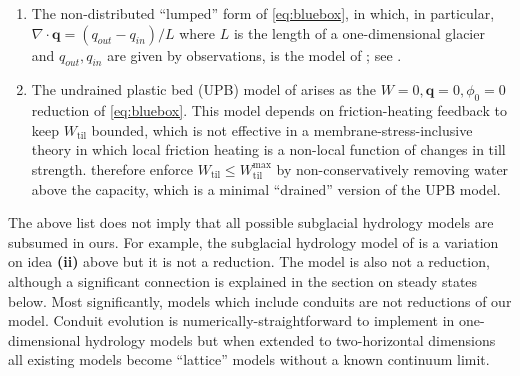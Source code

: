 \documentclass[gmd]{copernicus}   %
\newcommand{\text}{\textrm}
\newcommand\bq{\mathbf{q}}
\newcommand{\Div}{\nabla\cdot}
\newcommand{\Wtil}{W_{\text{til}}}
\newcommand{\Wtilmax}{W_{\text{til}}^{\text{max}}}
\begin{document}
\begin{enumerate}
\item The non-distributed ``lumped'' form of \eqref{eq:bluebox}, in which, in particular, $\Div \bq = (q_{out} - q_{in})/L$ where $L$ is the length of a one-dimensional glacier and $q_{out},q_{in}$ are given by observations, is the model of \cite{Bartholomausetal2011}; see \cite{Bueler2014correspondence}.

\item The undrained plastic bed (UPB) model of \cite{Tulaczyketal2000b} arises as the $W=0,\bq=0,\phi_0=0$ reduction of \eqref{eq:bluebox}.  This model depends on friction-heating feedback to keep $\Wtil$ bounded, which is not effective in a membrane-stress-inclusive theory in which local friction heating is a non-local function of changes in till strength.  \cite{BBssasliding} therefore enforce $\Wtil \le \Wtilmax$ by non-conservatively removing water above the capacity, which is a minimal ``drained'' version of the UPB model.
\end{enumerate}

The above list does not imply that all possible subglacial hydrology models are subsumed in ours.  For example, the subglacial hydrology model of \cite{JohnsonFastook} is a variation on idea \textbf{(ii)} above but it is not a reduction.  The \cite{FlowersClarke2002_theory} model is also not a reduction, although a significant connection is explained in the section on steady states below.  Most significantly, models which include conduits \citep[among others]{Schoofmeltsupply,PimentelFlowers2011,Hewittetal2012} are not reductions of our model.  Conduit evolution is numerically-straightforward to implement in one-dimensional hydrology models \citep{PimentelFlowers2011,Hewittetal2012,vanderWeletal2013} but when extended to two-horizontal dimensions all existing models \citep{Schoofmeltsupply,Hewitt2013,Werderetal2013} become ``lattice'' models without a known continuum limit.
\end{document}
